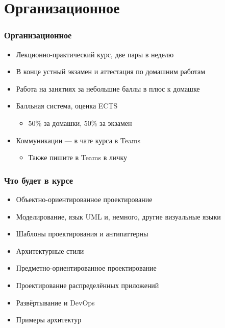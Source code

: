 \documentclass{../mcsslides}
\begin{document}
    \begin{frame}[plain]
        \titlepage
    \end{frame}

    \section{Организационное}

    \begin{frame}
        \frametitle{Организационное}
        \begin{itemize}
            \item Лекционно-практический курс, две пары в неделю
            \item В конце устный экзамен и аттестация по домашним работам
            \item Работа на занятиях за небольшие баллы в плюс к домашке
            \item Балльная система, оценка ECTS
            \begin{itemize}
                \item 50\% за домашки, 50\% за экзамен
            \end{itemize}
            \item Коммуникации --- в чате курса в Teams
            \begin{itemize}
                \item Также пишите в Teams в личку
            \end{itemize}
        \end{itemize}
    \end{frame}

    \begin{frame}
        \frametitle{Что будет в курсе}
        \begin{itemize}
            \item Объектно-ориентированное проектирование
            \item Моделирование, язык UML и, немного, другие визуальные языки
            \item Шаблоны проектирования и антипаттерны
            \item Архитектурные стили
            \item Предметно-ориентированное проектирование
            \item Проектирование распределённых приложений
            \item Развёртывание и DevOps
            \item Примеры архитектур
        \end{itemize}
    \end{frame}
\end{document}
